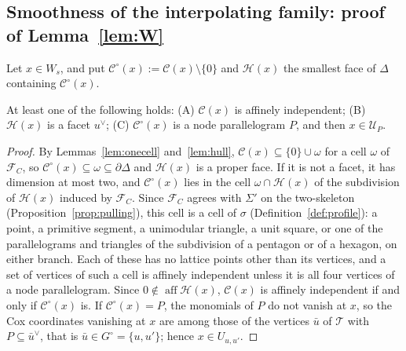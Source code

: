 \subsection{Smoothness of the interpolating family: proof of Lemma~\ref{lem:W}}\label{app:W}

Let $x\in W_s$, and put $\mathcal C^\circ(x):=\mathcal C(x)\setminus\{0\}$ and $\mathcal H(x)$ the smallest face of $\Delta$
containing $\mathcal C^\circ(x)$.

\begin{lemma}\label{lem:cases}
At least one of the following holds: (A) $\mathcal C(x)$ is affinely independent; (B) $\mathcal H(x)$ is a facet $u^\vee$;
(C) $\mathcal C^\circ(x)$ is a node parallelogram $P$, and then $x\in\mathcal U_P$.
\end{lemma}

\begin{proof}
By Lemmas~\ref{lem:onecell} and~\ref{lem:hull}, $\mathcal C(x)\subseteq\{0\}\cup\omega$ for a cell $\omega$ of $\mathcal F_C$,
so $\mathcal C^\circ(x)\subseteq\omega\subseteq\partial\Delta$ and $\mathcal H(x)$ is a proper face. If it is not a facet, it
has dimension at most two, and $\mathcal C^\circ(x)$ lies in the cell $\omega\cap\mathcal H(x)$ of the subdivision of
$\mathcal H(x)$ induced by $\mathcal F_C$. Since $\mathcal F_C$ agrees with $\Sigma'$ on the two-skeleton
(Proposition~\ref{prop:pulling}), this cell is a cell of $\sigma$ (Definition~\ref{def:profile}): a point, a primitive
segment, a unimodular triangle, a unit square, or one of the parallelograms and triangles of the subdivision of a
pentagon or of a hexagon, on either branch. Each of these has no lattice points other than its vertices, and a set of
vertices of such a cell is affinely independent unless it is all four vertices of a node parallelogram. Since
$0\notin\operatorname{aff}\mathcal H(x)$, $\mathcal C(x)$ is affinely independent if and only if $\mathcal C^\circ(x)$ is. If
$\mathcal C^\circ(x)=P$, the monomials of $P$ do not vanish at $x$, so the Cox coordinates vanishing at $x$ are among those
of the vertices $\bar u$ of $\mathcal T$ with $P\subseteq\bar u^\vee$, that is $\bar u\in G^\circ=\{u,u'\}$; hence
$x\in U_{u,u'}$.
\end{proof}

